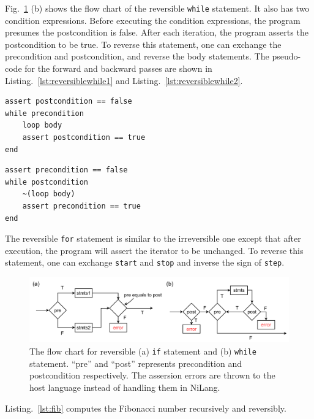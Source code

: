\documentclass{article}
\newcommand{\<}{\langle}
\renewcommand{\>}{\rangle}
\newcommand{\Fig}[1]{Fig.~\ref{#1}}
\newcommand{\Lst}[1]{Listing.~\ref{#1}}
\theoremstyle{definition}\newtheorem{definition}{\textit{Definition}}
\begin{document}
\Fig{fig:controlflow} (b) shows the flow chart of the reversible \texttt{while} statement. It also has two condition expressions. Before executing the condition expressions, the program presumes the postcondition is false.
After each iteration, the program asserts the postcondition to be true. To reverse this statement, one can exchange the precondition and postcondition, and reverse the body statements. The pseudo-code for the forward and backward passes are shown in \Lst{lst:reversiblewhile1} and \Lst{lst:reversiblewhile2}.

\begin{minipage}{.45\columnwidth}
\begin{lstlisting}[mathescape=true,caption={Translating a reversible \texttt{while} statement (forward)},label={lst:reversiblewhile1}]
assert postcondition == false
while precondition
    loop body
    assert postcondition == true
end
\end{lstlisting}
\end{minipage}
\hfill
\begin{minipage}{.45\columnwidth}
\begin{lstlisting}[mathescape=true,caption={Translating a reversible \texttt{while} statement (backward)},label={lst:reversiblewhile2}]
assert precondition == false
while postcondition
    ~(loop body)
    assert precondition == true
end
\end{lstlisting}
\end{minipage}

The reversible \texttt{for} statement is similar to the irreversible one except that after execution, the program will assert the iterator to be unchanged. To reverse this statement, one can exchange \texttt{start} and \texttt{stop} and inverse the sign of \texttt{step}.
\begin{figure}
    \centerline{\includegraphics[width=0.9\columnwidth,trim={0 0cm 0 0cm},clip]{controlflow.pdf}}
    \caption{The flow chart for reversible (a) \texttt{if} statement and (b) \texttt{while} statement. ``pre'' and ``post'' represents precondition and postcondition respectively. The assersion errors are thrown to the host language instead of handling them in NiLang.}\label{fig:controlflow}
\end{figure}
\Lst{lst:fib} computes the Fibonacci number recursively and reversibly.
\end{document}
